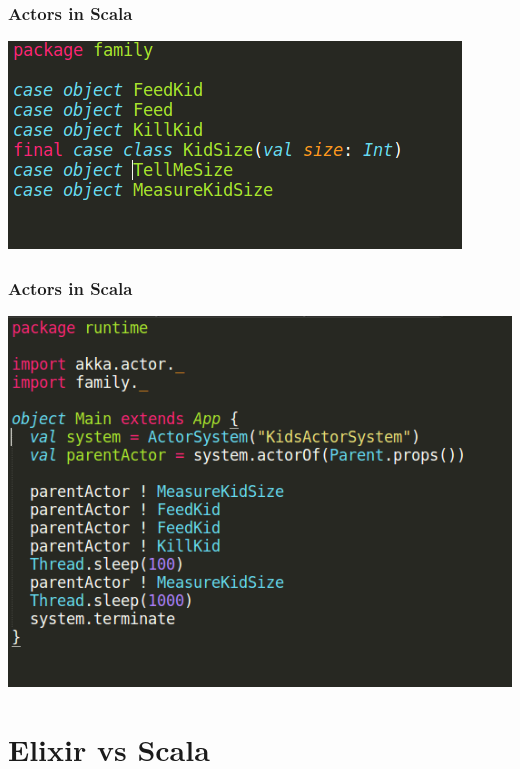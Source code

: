 \documentclass{beamer}
\begin{document}

\begin{frame}
\frametitle{Actors in Scala}
\includegraphics[width=1\linewidth]{./images/parent_messages.png}
\end{frame}


\begin{frame}
\frametitle{Actors in Scala}
\includegraphics[width=0.8\linewidth]{./images/parent_main.png}
\end{frame}


\section{Elixir vs Scala}

\end{document}
